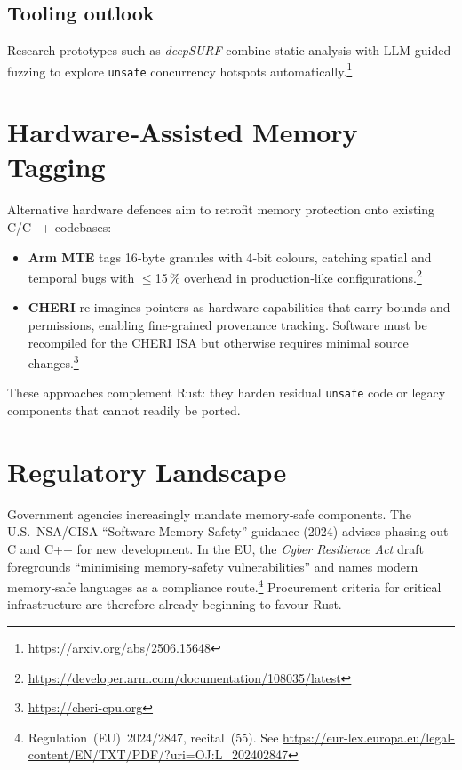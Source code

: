 \documentclass[11pt]{article}
\begin{document}
\subsection*{Tooling outlook}
Research prototypes such as \textit{deepSURF} combine static analysis with LLM‑guided fuzzing to explore \texttt{unsafe} concurrency hotspots automatically.\footnote{\url{https://arxiv.org/abs/2506.15648}}

\newpage
\section{Hardware‐Assisted Memory Tagging}
\label{sec:mte-cheri}

Alternative hardware defences aim to retrofit memory protection onto existing C/C++ codebases:

\begin{itemize}
    \item \textbf{Arm MTE} tags 16‑byte granules with 4‑bit colours, catching spatial and temporal bugs with $\le$15\,\% overhead in production‑like configurations.\footnote{\url{https://developer.arm.com/documentation/108035/latest}}
    \item \textbf{CHERI} re‑imagines pointers as hardware capabilities that carry bounds and permissions, enabling fine‑grained provenance tracking. Software must be recompiled for the CHERI ISA but otherwise requires minimal source changes.\footnote{\url{https://cheri-cpu.org}}
\end{itemize}

These approaches complement Rust: they harden residual \texttt{unsafe} code or legacy components that cannot readily be ported.

\newpage
\section{Regulatory Landscape}
\label{sec:regulatory}

Government agencies increasingly mandate memory‑safe components.  
The U.S.~NSA/CISA ``Software Memory Safety'' guidance (2024) advises phasing out C and C++ for new development.  
In the EU, the \textit{Cyber Resilience Act} draft foregrounds “minimising memory‑safety vulnerabilities” and names modern memory‑safe languages as a compliance route.\footnote{Regulation (EU) 2024/2847, recital (55). See \url{https://eur-lex.europa.eu/legal-content/EN/TXT/PDF/?uri=OJ:L_202402847}}  
Procurement criteria for critical infrastructure are therefore already beginning to favour Rust.
\end{document}
